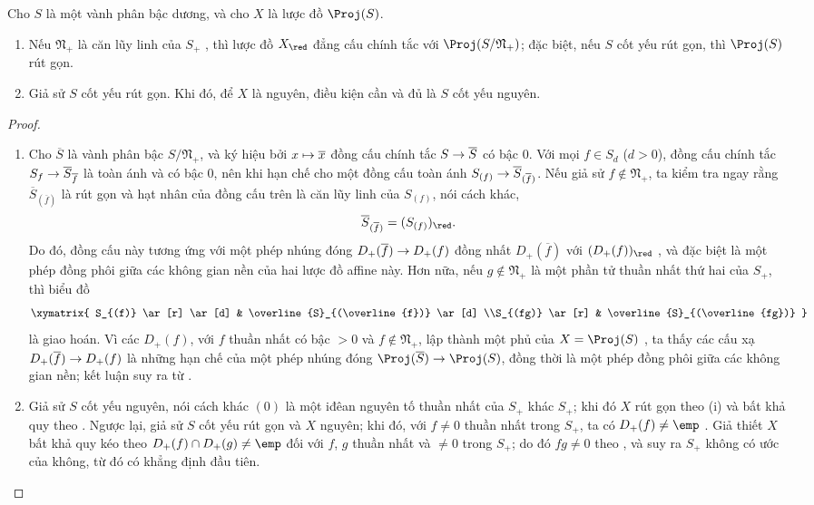 \documentclass[oneside,10pt]{amsart}
\makeatletter
\newcommand{\ega@arrow}[2]{\mathchoice{#1}{#2}{#2}{#2}}
\let\ega@shortmapsto\mapsto
\renewcommand{\to}{\ega@arrow{\longrightarrow}{\rightarrow}}
\renewcommand{\mapsto}{\ega@arrow{\longmapsto}{\ega@shortmapsto}}
\let\EGAOriginalLabel\label
\renewcommand{\label}[1]{\phantomsection\EGAOriginalLabel{#1}}
\makeatother
\begin{document}
\begin{proposition}[2.4.4]
\label{II.2.4.4}
Cho $S$ là một vành phân bậc dương, và cho $X$ là lược đồ $\Proj(S)$.
\begin{enumerate}
  \item[\rm(i)] Nếu $\mathfrak{N}_+$ là căn lũy linh của $S_+$ , thì lược đồ $X_\red$ đẳng cấu chính tắc với $\Proj(S/\mathfrak{N}_+)$; đặc biệt, nếu $S$ cốt yếu rút gọn, thì $\Proj(S)$ rút gọn.
  \item[\rm(ii)] Giả sử $S$ cốt yếu rút gọn. Khi đó, để $X$ là nguyên, điều kiện cần và đủ là $S$ cốt yếu nguyên.
\end{enumerate}
\end{proposition}

\begin{proof}
\medskip\noindent
\begin{enumerate}
  \item[\rm(i)] Cho $\overline{S}$ là vành phân bậc $S/\mathfrak{N}_+$, và ký hiệu bởi $x\mapsto\overline{x}$ đồng cấu chính tắc $S\to\overline{S}$ có bậc $0$.
  Với mọi $f\in S_d$ ($d>0$), đồng cấu chính tắc $S_f\to\overline{S}_{\overline{f}}$  là toàn ánh và có bậc $0$, nên khi hạn chế cho một đồng cấu toàn ánh $S_{(f)}\to\overline{S}_{(\overline{f})}$.
  Nếu giả sử $f\notin\mathfrak{N}_+$, ta kiểm tra ngay rằng $\overline{S}_{(\overline{f})}$ là rút gọn và hạt nhân của đồng cấu trên là căn lũy linh của $S_{(f)}$, nói cách khác,
  \[
    \overline{S}_{(\overline{f})}=(S_{(f)})_\red.
  \]
  Do đó, đồng cấu này tương ứng với một phép nhúng đóng $D_+(\overline{f})\to D_+(f)$ đồng nhất $D_+(\overline{f})$ với $(D_+(f))_\red$ , và đặc biệt là một phép đồng phôi giữa các không gian nền của hai lược đồ affine này.
  Hơn nữa, nếu $g\notin\mathfrak{N}_+$ là một phần tử thuần nhất thứ hai của $S_+$, thì biểu đồ
  \[
    \xymatrix{
      S_{(f)} \ar[r] \ar[d]
      & \overline{S}_{(\overline{f})} \ar[d]
    \\S_{(fg)} \ar[r]
      & \overline{S}_{(\overline{fg})}
    }
  \]
  là giao hoán.
  Vì các $D_+(f)$, với $f$ thuần nhất có bậc $>0$ và $f\notin\mathfrak{N}_+$, lập thành một phủ của $X=\Proj(S)$ , ta thấy các cấu xạ $D_+(\overline{f})\to D_+(f)$ là những hạn chế của một phép nhúng đóng $\Proj(\overline{S})\to\Proj(S)$, đồng thời là một phép đồng phôi giữa các không gian nền; kết luận suy ra từ .
  \item[\rm(ii)] Giả sử $S$ cốt yếu nguyên, nói cách khác $(0)$ là một iđêan nguyên tố thuần nhất của $S_+$ khác $S_+$; khi đó $X$ rút gọn theo (i) và bất khả quy theo .
  Ngược lại, giả sử $S$ cốt yếu rút gọn và $X$ nguyên; khi đó, với $f\neq0$ thuần nhất trong $S_+$, ta có $D_+(f)\neq\emp$ .
  Giả thiết $X$ bất khả quy kéo theo $D_+(f)\cap D_+(g)\neq\emp$ đối với $f$, $g$ thuần nhất và $\neq0$ trong $S_+$; do đó $fg\neq0$ theo , và suy ra $S_+$ không có ước của không, từ đó có khẳng định đầu tiên.
\end{enumerate}
\end{proof}
\end{document}
